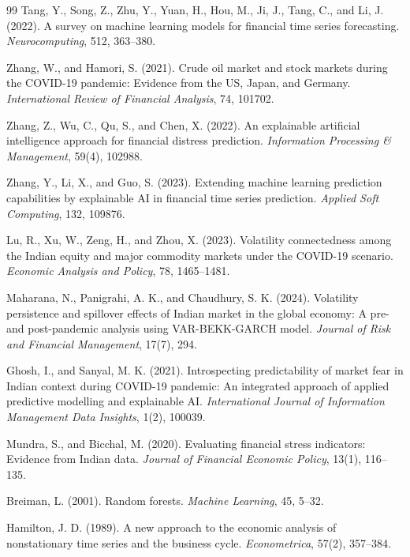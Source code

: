 \documentclass[12pt,a4paper]{article}
\begin{document}
\begin{thebibliography}{99}
Tang, Y., Song, Z., Zhu, Y., Yuan, H., Hou, M., Ji, J., Tang, C., and Li, J. (2022). A survey on machine learning models for financial time series forecasting. \textit{Neurocomputing}, 512, 363--380.

Zhang, W., and Hamori, S. (2021). Crude oil market and stock markets during the COVID-19 pandemic: Evidence from the US, Japan, and Germany. \textit{International Review of Financial Analysis}, 74, 101702.

Zhang, Z., Wu, C., Qu, S., and Chen, X. (2022). An explainable artificial intelligence approach for financial distress prediction. \textit{Information Processing \& Management}, 59(4), 102988.

Zhang, Y., Li, X., and Guo, S. (2023). Extending machine learning prediction capabilities by explainable AI in financial time series prediction. \textit{Applied Soft Computing}, 132, 109876.

Lu, R., Xu, W., Zeng, H., and Zhou, X. (2023). Volatility connectedness among the Indian equity and major commodity markets under the COVID-19 scenario. \textit{Economic Analysis and Policy}, 78, 1465--1481.

Maharana, N., Panigrahi, A. K., and Chaudhury, S. K. (2024). Volatility persistence and spillover effects of Indian market in the global economy: A pre- and post-pandemic analysis using VAR-BEKK-GARCH model. \textit{Journal of Risk and Financial Management}, 17(7), 294.

Ghosh, I., and Sanyal, M. K. (2021). Introspecting predictability of market fear in Indian context during COVID-19 pandemic: An integrated approach of applied predictive modelling and explainable AI. \textit{International Journal of Information Management Data Insights}, 1(2), 100039.

Mundra, S., and Bicchal, M. (2020). Evaluating financial stress indicators: Evidence from Indian data. \textit{Journal of Financial Economic Policy}, 13(1), 116--135.

Breiman, L. (2001). Random forests. \textit{Machine Learning}, 45, 5--32.

Hamilton, J. D. (1989). A new approach to the economic analysis of nonstationary time series and the business cycle. \textit{Econometrica}, 57(2), 357--384.


\end{thebibliography}
\end{document}
